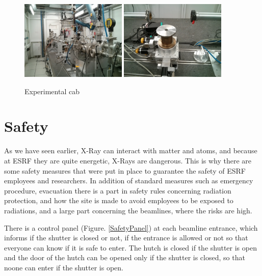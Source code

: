 \documentclass[11pt,a4paper,oneside]{report}
\begin{document}
\begin{figure}[H]
    \begin{center}
        \includegraphics[width=0.45\textwidth]{Images/IMG_20151210_203229.jpg}
        \hspace{0.05\textwidth}
        \includegraphics[width=0.45\textwidth]{Images/IMG_20151210_203316.jpg}
        \caption{Experimental cab}
        \label{ligne_mesure}
    \end{center}
\end{figure}


\section{Safety}\label{Safety}
As we have seen earlier, X-Ray can interact with matter and atoms, and because at ESRF they are quite energetic, X-Rays are dangerous. This is why there are some safety measures that were put in place to guarantee the safety of ESRF employees and researchers. In addition of standard measures such as emergency procedure, evacuation there is a part in safety rules concerning radiation protection, and how the site is made to avoid employees to be exposed to radiations, and a large part concerning the beamlines, where the risks are high.

There is a control panel (Figure. \ref{SafetyPanel}) at each beamline entrance, which informs if the shutter is closed or not, if the entrance is allowed or not so that everyone can know if it is safe to enter. The hutch is closed if the shutter is open and the door of the hutch can be opened only if the shutter is closed, so that noone can enter if the shutter is open.
\end{document}
